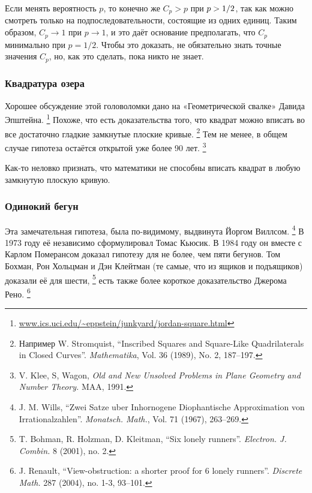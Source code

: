 Если менять вероятность $p$, то конечно же $C_p>p$ при $p \z> 1/2$, так как можно смотреть только на подпоследовательности, состоящие из одних единиц.
Таким образом, $C_p\to 1$ при $p\to 1$, и это даёт основание предполагать, что $C_p$ минимально при $p=1/2$.
Чтобы это доказать, не обязательно знать точные значения $C_p$,
но, как это сделать, пока никто не знает.

\subsubsection*{Квадратура озера}

Хорошее обсуждение этой головоломки дано на «Геометрической свалке» Давида Эпштейна.%
\footnote{\href{http://www.ics.uci.edu/~eppstein/junkyard/jordan-square.html}{\url{www.ics.uci.edu/~eppstein/junkyard/jordan-square.html}}}
Похоже, что есть доказательства того, что квадрат можно вписать во все достаточно гладкие замкнутые плоские кривые.%
\footnote{Например W. Stromquist, ``Inscribed Squares and Square-Like Quadrilaterals in Closed Curves''. \emph{Mathematika}, Vol. 36 (1989), No. 2, 187--197.}
Тем не менее, в общем случае гипотеза остаётся открытой уже более 90 лет.%
\footnote{V. Klee, S, Wagon, \emph{Old and New Unsolved Problems in Plane Geometry and Number Theory.} MAA, 1991.}

\medskip

Как-то неловко признать, что математики не способны вписать квадрат в любую замкнутую плоскую кривую.

\subsubsection*{Одинокий бегун}

{

\sloppy

Эта замечательная гипотеза, была по-видимому, выдвинута Йоргом Виллсом.%
\footnote{J. M. Wills, ``Zwei Satze uber Inhornogene Diophantische Approximation von Irrationalzahlen''. \emph{Monatsch. Math.}, Vol. 71 (1967), 263--269.}
В 1973 году её независимо сформулировал Томас Кьюсик.
В 1984 году он вместе с Карлом Померансом доказал гипотезу для не более, чем пяти бегунов.
Том Бохман, Рон Хольцман и Дэн Клейтман (те самые, что из ящиков и подъящиков) доказали её для шести,%
\footnote{T. Bohman, R. Holzman, D. Kleitman,
``Six lonely runners''.
\emph{Electron. J. Combin.} 8 (2001), no. 2.
}
есть также более короткое доказательство Джерома Рено.%
\footnote{J. Renault, ``View-obstruction: a shorter proof for 6 lonely runners''. \emph{Discrete Math.} 287 (2004), no. 1-3, 93--101.}

}

